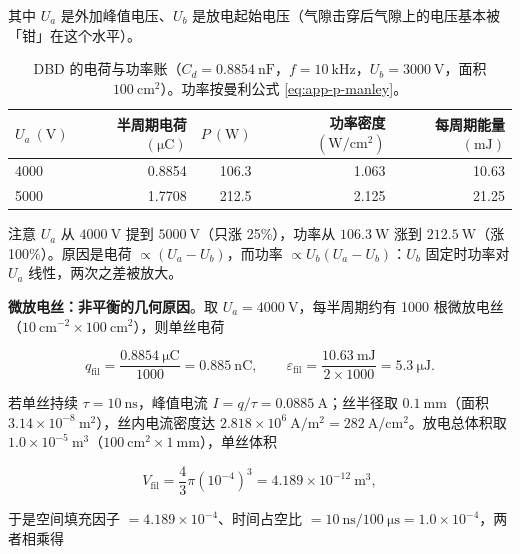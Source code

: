 其中 $U_a$ 是外加峰值电压、$U_b$ 是放电起始电压（气隙击穿后气隙上的电压基本被「钳」在这个水平）。

\begin{table}[htbp]
  \centering
  \small
  \caption{DBD 的电荷与功率账（$C_d=0.8854\ \mathrm{nF}$，$f=10\ \mathrm{kHz}$，$U_b=3000\ \mathrm{V}$，面积 $100\ \mathrm{cm^2}$）。功率按曼利公式 \eqref{eq:app-p-manley}。}
  \label{tab:app-p-dbd}
  \begin{tabular}{@{}lrrrr@{}}
    \toprule
    $U_a\ (\mathrm{V})$ & 半周期电荷 $(\mathrm{\mu C})$ & $P\ (\mathrm{W})$ & 功率密度 $(\mathrm{W/cm^2})$ & 每周期能量 $(\mathrm{mJ})$ \\
    \midrule
    4000 & 0.8854 & 106.3 & 1.063 & 10.63 \\
    5000 & 1.7708 & 212.5 & 2.125 & 21.25 \\
    \bottomrule
  \end{tabular}
\end{table}

注意 $U_a$ 从 $4000\ \mathrm{V}$ 提到 $5000\ \mathrm{V}$（只涨 25\%），功率从 $106.3\ \mathrm{W}$ 涨到 $212.5\ \mathrm{W}$（涨 100\%）。原因是电荷 $\propto(U_a-U_b)$，而功率 $\propto U_b(U_a-U_b)$：$U_b$ 固定时功率对 $U_a$ 线性，两次之差被放大。

\textbf{微放电丝：非平衡的几何原因}。取 $U_a=4000\ \mathrm{V}$，每半周期约有 1000 根微放电丝（$10\ \mathrm{cm^{-2}}\times100\ \mathrm{cm^2}$），则单丝电荷

\begin{equation}
  q_{\mathrm{fil}} = \frac{0.8854\ \mathrm{\mu C}}{1000} = 0.885\ \mathrm{nC},
  \qquad
  \varepsilon_{\mathrm{fil}} = \frac{10.63\ \mathrm{mJ}}{2\times1000} = 5.3\ \mathrm{\mu J}.
  \label{eq:app-p-filament}
\end{equation}

若单丝持续 $\tau=10\ \mathrm{ns}$，峰值电流 $I=q/\tau = 0.0885\ \mathrm{A}$；丝半径取 $0.1\ \mathrm{mm}$（面积 $3.14\times10^{-8}\ \mathrm{m^2}$），丝内电流密度达 $2.818\times10^{6}\ \mathrm{A/m^2}=282\ \mathrm{A/cm^2}$。放电总体积取 $1.0\times10^{-5}\ \mathrm{m^3}$（$100\ \mathrm{cm^2}\times1\ \mathrm{mm}$），单丝体积

\begin{equation}
  V_{\mathrm{fil}} = \frac{4}{3}\pi (10^{-4})^3 = 4.189\times10^{-12}\ \mathrm{m^3},
  \label{eq:app-p-filvol}
\end{equation}

于是空间填充因子 $=4.189\times10^{-4}$、时间占空比 $=10\ \mathrm{ns}/100\ \mathrm{\mu s}=1.0\times10^{-4}$，两者相乘得

